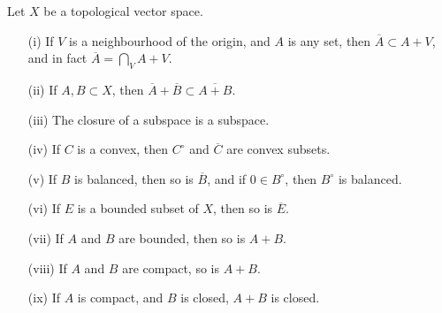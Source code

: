 \begin{theorem}
    Let $X$ be a topological vector space.
    \begin{enumerate}
        \item[(i)] If $V$ is a neighbourhood of the origin, and $A$ is any set, then $\overline{A} \subset A + V$, and in fact $\overline{A} = \bigcap_V A + V$.
        \item[(ii)] If $A,B \subset X$, then $\overline{A} + \overline{B} \subset \overline{A + B}$.
        \item[(iii)] The closure of a subspace is a subspace.
        \item[(iv)] If $C$ is a convex, then $C^\circ$ and $\overline{C}$ are convex subsets.
        \item[(v)] If $B$ is balanced, then so is $\overline{B}$, and if $0 \in B^\circ$, then $B^\circ$ is balanced.
        \item[(vi)] If $E$ is a bounded subset of $X$, then so is $\overline{E}$.
        \item[(vii)] If $A$ and $B$ are bounded, then so is $A + B$.
        \item[(viii)] If $A$ and $B$ are compact, so is $A + B$.
        \item[(ix)] If $A$ is compact, and $B$ is closed, $A + B$ is closed.
    \end{enumerate}
\end{theorem}
